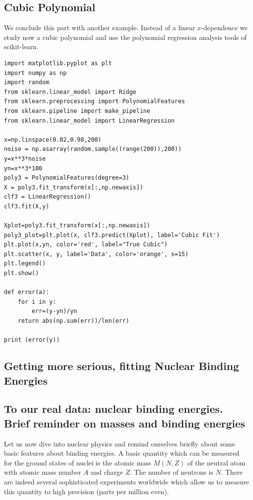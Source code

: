 \documentclass[%
oneside,                 %
final,                   %
10pt]{article}
\begin{document}
\subsection*{Cubic Polynomial}
We conclude this part with another example. Instead of 
a linear $x$-dependence we study now a cubic polynomial and use the polynomial regression analysis tools of scikit-learn. 

\begin{verbatim}
import matplotlib.pyplot as plt
import numpy as np
import random
from sklearn.linear_model import Ridge
from sklearn.preprocessing import PolynomialFeatures
from sklearn.pipeline import make_pipeline
from sklearn.linear_model import LinearRegression

x=np.linspace(0.02,0.98,200)
noise = np.asarray(random.sample((range(200)),200))
y=x**3*noise
yn=x**3*100
poly3 = PolynomialFeatures(degree=3)
X = poly3.fit_transform(x[:,np.newaxis])
clf3 = LinearRegression()
clf3.fit(X,y)

Xplot=poly3.fit_transform(x[:,np.newaxis])
poly3_plot=plt.plot(x, clf3.predict(Xplot), label='Cubic Fit')
plt.plot(x,yn, color='red', label="True Cubic")
plt.scatter(x, y, label='Data', color='orange', s=15)
plt.legend()
plt.show()

def error(a):
    for i in y:
        err=(y-yn)/yn
    return abs(np.sum(err))/len(err)

print (error(y))
\end{verbatim}

\subsection*{Getting more serious, fitting Nuclear Binding Energies}


\subsection*{To our real data: nuclear binding energies. Brief reminder on masses and binding energies}

Let us now dive into  nuclear physics and remind ourselves briefly about some basic features about binding
energies.  A basic quantity which can be measured for the ground
states of nuclei is the atomic mass $M(N, Z)$ of the neutral atom with
atomic mass number $A$ and charge $Z$. The number of neutrons is $N$. There are indeed several sophisticated experiments worldwide which allow us to measure this quantity to high precision (parts per million even). 
\end{document}
